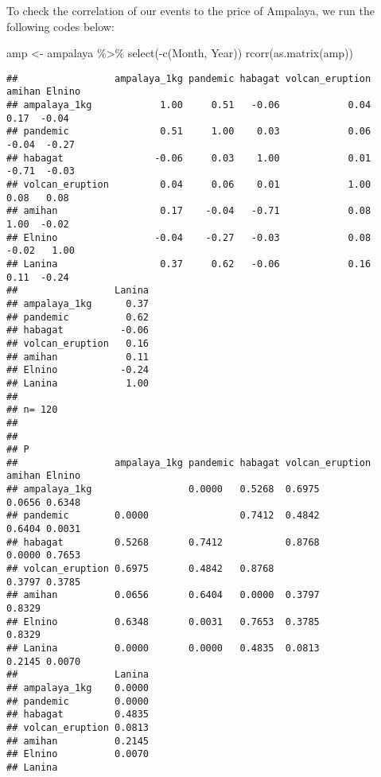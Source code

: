 \documentclass[
]{article}
\newenvironment{Shaded}{\begin{snugshade}}{\end{snugshade}}
\newcommand{\FunctionTok}[1]{\textcolor[rgb]{0.00,0.00,0.00}{#1}}
\newcommand{\NormalTok}[1]{#1}
\newcommand{\OtherTok}[1]{\textcolor[rgb]{0.56,0.35,0.01}{#1}}
\newcommand{\SpecialCharTok}[1]{\textcolor[rgb]{0.00,0.00,0.00}{#1}}
\begin{document}
To check the correlation of our events to the price of Ampalaya, we run
the following codes below:

\begin{Shaded}
\begin{Highlighting}[]
\NormalTok{amp }\OtherTok{\textless{}{-}}\NormalTok{ ampalaya }\SpecialCharTok{\%\textgreater{}\%} \FunctionTok{select}\NormalTok{(}\SpecialCharTok{{-}}\FunctionTok{c}\NormalTok{(Month, Year))}
\FunctionTok{rcorr}\NormalTok{(}\FunctionTok{as.matrix}\NormalTok{(amp))}
\end{Highlighting}
\end{Shaded}

\begin{verbatim}
##                 ampalaya_1kg pandemic habagat volcan_eruption amihan Elnino
## ampalaya_1kg            1.00     0.51   -0.06            0.04   0.17  -0.04
## pandemic                0.51     1.00    0.03            0.06  -0.04  -0.27
## habagat                -0.06     0.03    1.00            0.01  -0.71  -0.03
## volcan_eruption         0.04     0.06    0.01            1.00   0.08   0.08
## amihan                  0.17    -0.04   -0.71            0.08   1.00  -0.02
## Elnino                 -0.04    -0.27   -0.03            0.08  -0.02   1.00
## Lanina                  0.37     0.62   -0.06            0.16   0.11  -0.24
##                 Lanina
## ampalaya_1kg      0.37
## pandemic          0.62
## habagat          -0.06
## volcan_eruption   0.16
## amihan            0.11
## Elnino           -0.24
## Lanina            1.00
## 
## n= 120 
## 
## 
## P
##                 ampalaya_1kg pandemic habagat volcan_eruption amihan Elnino
## ampalaya_1kg                 0.0000   0.5268  0.6975          0.0656 0.6348
## pandemic        0.0000                0.7412  0.4842          0.6404 0.0031
## habagat         0.5268       0.7412           0.8768          0.0000 0.7653
## volcan_eruption 0.6975       0.4842   0.8768                  0.3797 0.3785
## amihan          0.0656       0.6404   0.0000  0.3797                 0.8329
## Elnino          0.6348       0.0031   0.7653  0.3785          0.8329       
## Lanina          0.0000       0.0000   0.4835  0.0813          0.2145 0.0070
##                 Lanina
## ampalaya_1kg    0.0000
## pandemic        0.0000
## habagat         0.4835
## volcan_eruption 0.0813
## amihan          0.2145
## Elnino          0.0070
## Lanina
\end{verbatim}
\end{document}
